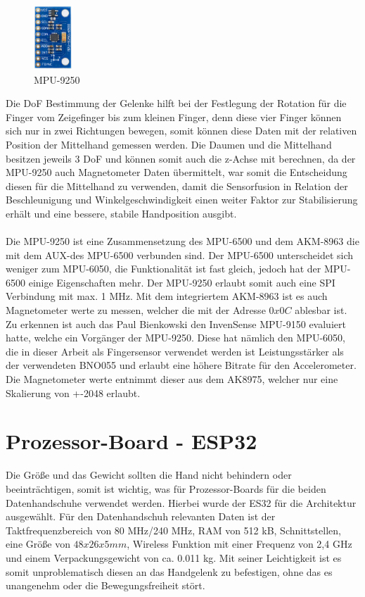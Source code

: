 \begin{figure}
  \begin{center}
    \includegraphics[width=0.13\textwidth]{Bachelorarbeit/images/9250.png}
  \end{center}
  \caption{MPU-9250}
\end{figure}
Die DoF Bestimmung der Gelenke hilft bei der Festlegung der Rotation für die Finger vom Zeigefinger bis zum kleinen Finger, denn diese vier Finger können sich nur in zwei Richtungen bewegen, somit können diese Daten mit der relativen Position der Mittelhand gemessen werden. 
Die Daumen und die Mittelhand besitzen jeweils 3 DoF und können somit auch die z-Achse mit berechnen, da der MPU-9250 auch Magnetometer Daten übermittelt, war somit die Entscheidung diesen für die Mittelhand zu verwenden, damit die Sensorfusion in Relation der Beschleunigung und Winkelgeschwindigkeit einen weiter Faktor zur Stabilisierung erhält und eine bessere, stabile Handposition ausgibt.
\\
\\
Die MPU-9250 ist eine Zusammensetzung des MPU-6500 und dem AKM-8963 die mit dem AUX-\iic des MPU-6500 verbunden sind. Der MPU-6500 unterscheidet sich weniger zum MPU-6050, die Funktionalität ist fast gleich, jedoch hat der MPU-6500 einige Eigenschaften mehr. Der MPU-9250 erlaubt somit auch eine SPI Verbindung mit max. 1 MHz. Mit dem integriertem AKM-8963 ist es auch Magnetometer werte zu messen, welcher die mit der Adresse $0x0C$ ablesbar ist. 
Zu erkennen ist auch das Paul Bienkowski den InvenSense MPU-9150 evaluiert hatte, welche ein Vorgänger der MPU-9250. Diese hat nämlich den MPU-6050, die in dieser Arbeit als Fingersensor verwendet werden ist Leistungsstärker als der verwendeten BNO055 und erlaubt eine höhere Bitrate für den Accelerometer. Die Magnetometer werte entnimmt dieser aus dem AK8975, welcher nur eine Skalierung von +-2048 erlaubt.

\newpage
\section{Prozessor-Board - ESP32}
Die Größe und das Gewicht sollten die Hand nicht behindern oder beeinträchtigen, somit ist wichtig, was für Prozessor-Boards für die beiden Datenhandschuhe verwendet werden.
Hierbei wurde der ES32 für die Architektur ausgewählt. Für den Datenhandschuh relevanten Daten ist der Taktfrequenzbereich von 80 MHz/240 MHz, RAM von 512 kB, \iic Schnittstellen, eine Größe von $48x26x5mm$, Wireless Funktion mit einer Frequenz von 2,4 GHz und einem Verpackungsgewicht von ca. 0.011 kg. Mit seiner Leichtigkeit ist es somit unproblematisch diesen an das Handgelenk zu befestigen, ohne das es unangenehm oder die Bewegungsfreiheit stört.


